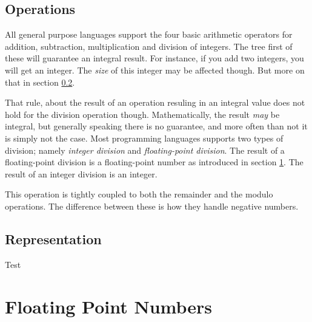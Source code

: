 \subsection{Operations}

All general purpose languages support the four basic arithmetic operators for addition, subtraction, multiplication and division of integers. The tree first of these will guarantee an integral result. For instance, if you add two integers, you will get an integer. The \textsl{size} of this integer may be affected though. But more on that in section \ref{primitives:int:representation}.

That rule, about the result of an operation resuling in an integral value does not hold for the division operation though. Mathematically, the result \textsl{may} be integral, but generally speaking there is no guarantee, and more often than not it is simply not the case. Most programming languages supports two types of division; namely \textsl{integer division} and \textsl{floating-point division}. The result of a floating-point division is a floating-point number as introduced in section \ref{primitives:float}. The result of an integer division is an integer.

This operation is tightly coupled to both the remainder and the modulo operations. The difference between these is how they handle negative numbers.


\subsection{Representation}
\label{primitives:int:representation}



\csharpsubsection{\csharp}

\begin{syntaxsegment}
  Test
\end{syntaxsegment}





\section{Floating Point Numbers}
\label{primitives:float}

